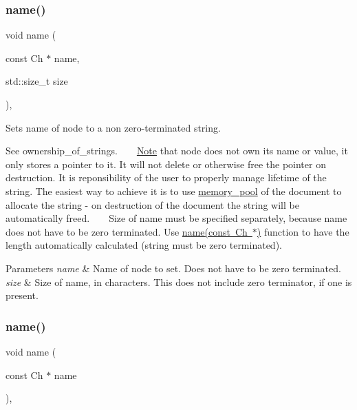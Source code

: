\subsubsection{\texorpdfstring{name()}{name()}\hspace{0.1cm}{\footnotesize\ttfamily [2/3]}}
{\footnotesize\ttfamily void name (\begin{DoxyParamCaption}\item[{const Ch $\ast$}]{name,  }\item[{std\+::size\+\_\+t}]{size }\end{DoxyParamCaption})\hspace{0.3cm}{\ttfamily [inline]}, {\ttfamily [inherited]}}



Sets name of node to a non zero-\/terminated string. 

See ownership\+\_\+of\+\_\+strings. ~\newline
~\newline
 \mbox{\hyperlink{classNote}{Note}} that node does not own its name or value, it only stores a pointer to it. It will not delete or otherwise free the pointer on destruction. It is reponsibility of the user to properly manage lifetime of the string. The easiest way to achieve it is to use \mbox{\hyperlink{classrapidxml_1_1memory__pool}{memory\+\_\+pool}} of the document to allocate the string -\/ on destruction of the document the string will be automatically freed. ~\newline
~\newline
 Size of name must be specified separately, because name does not have to be zero terminated. Use \mbox{\hyperlink{classrapidxml_1_1xml__base_ae099c291e104a0d277307fe71f5e0f9e}{name(const Ch $\ast$)}} function to have the length automatically calculated (string must be zero terminated). 
\begin{DoxyParams}{Parameters}
{\em name} & Name of node to set. Does not have to be zero terminated. \\
\hline
{\em size} & Size of name, in characters. This does not include zero terminator, if one is present. \\
\hline
\end{DoxyParams}
\mbox{\label{classrapidxml_1_1xml__base_ae099c291e104a0d277307fe71f5e0f9e}} 
\subsubsection{\texorpdfstring{name()}{name()}\hspace{0.1cm}{\footnotesize\ttfamily [3/3]}}
{\footnotesize\ttfamily void name (\begin{DoxyParamCaption}\item[{const Ch $\ast$}]{name }\end{DoxyParamCaption})\hspace{0.3cm}{\ttfamily [inline]}, {\ttfamily [inherited]}}



